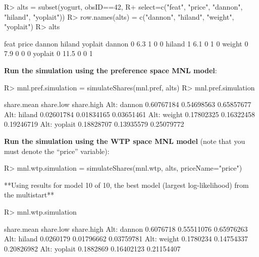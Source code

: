 \documentclass[article]{jss}
\begin{document}
\begin{CodeChunk}

\begin{CodeInput}
R> alts = subset(yogurt, obsID==42,
R+        select=c("feat", "price", "dannon", "hiland", "yoplait"))
R> row.names(alts) = c("dannon", "hiland", "weight", "yoplait")
R> alts
\end{CodeInput}

\begin{CodeOutput}
        feat price dannon hiland yoplait
dannon     0   6.3      1      0       0
hiland     1   6.1      0      1       0
weight     0   7.9      0      0       0
yoplait    0  11.5      0      0       1
\end{CodeOutput}
\end{CodeChunk}

\textbf{Run the simulation using the preference space MNL model}:

\begin{CodeChunk}

\begin{CodeInput}
R> mnl.pref.simulation = simulateShares(mnl.pref, alts)
R> mnl.pref.simulation
\end{CodeInput}

\begin{CodeOutput}
             share.mean  share.low share.high
Alt: dannon  0.60767184 0.54698563 0.65857677
Alt: hiland  0.02601784 0.01834165 0.03651461
Alt: weight  0.17802325 0.16322458 0.19246719
Alt: yoplait 0.18828707 0.13935579 0.25079772
\end{CodeOutput}
\end{CodeChunk}

\textbf{Run the simulation using the WTP space MNL model} (note that you
must denote the ``price'' variable):

\begin{CodeChunk}

\begin{CodeInput}
R> mnl.wtp.simulation = simulateShares(mnl.wtp, alts, priceName="price")
\end{CodeInput}

\begin{CodeOutput}
**Using results for model 10 of 10,
the best model (largest log-likelihood) from the multistart**
\end{CodeOutput}

\begin{CodeInput}
R> mnl.wtp.simulation
\end{CodeInput}

\begin{CodeOutput}
             share.mean  share.low share.high
Alt: dannon   0.6076718 0.55511076 0.65976263
Alt: hiland   0.0260179 0.01796662 0.03759781
Alt: weight   0.1780234 0.14754337 0.20826982
Alt: yoplait  0.1882869 0.16402123 0.21154407
\end{CodeOutput}
\end{CodeChunk}
\end{document}
